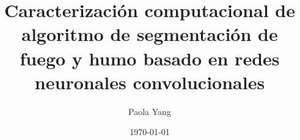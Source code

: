 \documentclass{beamer}
\title[]{Caracterización computacional de algoritmo de segmentación de fuego y humo basado en redes neuronales convolucionales}
\author{Paola Yang}
\institute{UTFSM}
\date{\today}
\begin{document}
\begin{frame}
  \titlepage
\end{frame}









\end{document}
